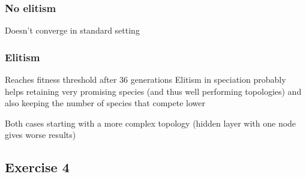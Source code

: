 \subsubsection*{No elitism}
Doesn't converge in standard setting

\subsubsection*{Elitism}
Reaches fitness threshold after 36 generations
Elitism in speciation probably helps retaining very promising species (and thus well performing topologies) and also keeping the number of species that compete lower

Both cases starting with a more complex topology (hidden layer with one node gives worse results)
\subsection{Exercise 4}